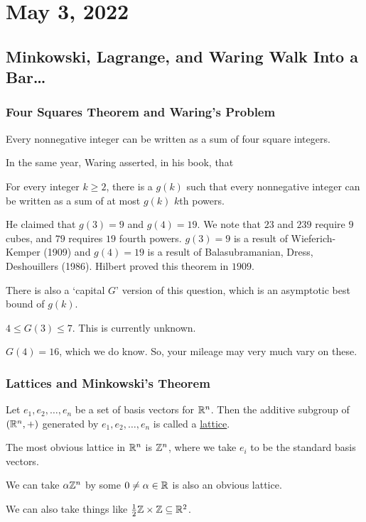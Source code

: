 \section{May 3, 2022}
\subsection{Minkowski, Lagrange, and Waring Walk Into a Bar\dots}
\subsubsection{Four Squares Theorem and Waring's Problem}
\begin{theorem}[Lagrange, 1770]
    Every nonnegative integer can be written as a sum of four square integers.
\end{theorem}
In the same year, Waring asserted, in his book, that
\begin{theorem}[Waring, 1770]
    For every integer $k\geq 2$, there is a $g(k)$ such that every nonnegative integer can be written as a sum of at most $g(k)$ $k$th powers.
\end{theorem}
He claimed that $g(3) = 9$ and $g(4) = 19$. We note that $23$ and $239$ require $9$ cubes, and $79$ requires $19$ fourth powers. $g(3) = 9$ is a result of Wieferich-Kemper (1909) and $g(4) = 19$ is a result of Balasubramanian, Dress, Deshouillers (1986). Hilbert proved this theorem in $1909$.

There is also a `capital $G$' version of this question, which is an asymptotic best bound of $g(k)$.

$4 \leq G(3) \leq 7$. This is currently unknown.

$G(4) = 16$, which we do know. So, your mileage may very much vary on these.

\subsubsection{Lattices and Minkowski's Theorem}
\begin{definition}[Lattice]
    Let $e_1, e_2, \dots, e_n$ be a set of basis vectors for $\mathbb R^n$. Then the additive subgroup of $(\mathbb R^n, +)$ generated by $e_1, e_2, \dots, e_n$ is called a \ul{lattice}.
\end{definition}
\begin{example}
    The most obvious lattice in $\mathbb R^n$ is $\mathbb Z^n$, where we take $e_i$ to be the standard basis vectors.

    We can take $\alpha\mathbb Z^n$ by some $0\neq \alpha\in\mathbb R$ is also an obvious lattice.

    We can also take things like $\frac{1}{2}\mathbb Z\times \mathbb Z\subseteq\mathbb R^2$.
\end{example}

